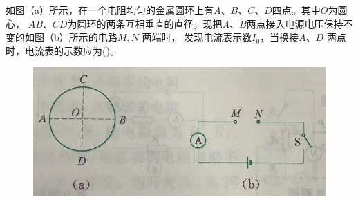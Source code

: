 \documentclass[a4paper,cs4size]{BHCexam}
\begin{document}
\begin{groups}
\begin{questions}[]
        \question[5]如图（a）所示，在一个电阻均匀的金属圆环上有$A$、$B$、$C$、$D$四点。其中$O$为圆心，
        $AB$、$CD$为圆环的两条互相垂直的直径。现把$A$、$B$两点接入电源电压保持不变的如图（b）所示的电路$M,N$ 两端时，
        发现电流表示数$I_0$，当换接$A$、$D$ 两点时，电流表的示数应为(\quad\quad\quad)。
        \begin{figure}[htb]
            \flushright
            \includegraphics [scale=0.35,trim=0 0 0 0]{./image/physics_circuit2_9.png}
            \label{fig:fig_circuit2_9}
        \end{figure}
        \vspace{0.5cm}




    \end{questions}





\end{groups}


\label{lastpage}
\end{document}
